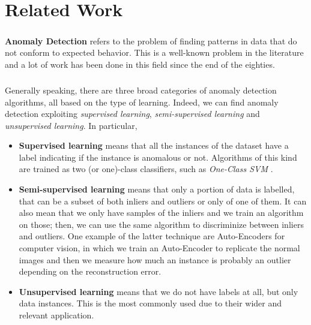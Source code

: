 \chapter{Related Work}
\label{ch:state_of_art}
\paragraph{}
\textbf{Anomaly Detection} refers to the problem of finding patterns in data that do not conform to expected behavior. 
This is a well-known problem in the literature and a lot of work has been done in this field since the end of the eighties. 

\paragraph{}
Generally speaking, there are three broad categories of anomaly detection algorithms, all based on the type of learning. Indeed, we can find anomaly detection exploiting \textit{supervised learning}, \textit{semi-supervised learning} and \textit{unsupervised learning}.
In particular,
\begin{itemize}
    \item \textbf{Supervised learning} means that all the instances of the dataset have a label indicating if the instance is anomalous or not. Algorithms of this kind are trained as two (or one)-class classifiers, such as \textit{One-Class SVM} \cite{one-class-svm}.
    
    \item \textbf{Semi-supervised learning} means that only a portion of data is labelled, that can be a subset of both inliers and outliers or only of one of them. It can also mean that we only have samples of the inliers and we train an algorithm on those; then, we can use the same algorithm to discriminize between inliers and outliers. One example of the latter technique are Auto-Encoders for computer vision, in which we train an Auto-Encoder to replicate the normal images and then we measure how much an instance is probably an outlier depending on the reconstruction error.
    
    \item \textbf{Unsupervised learning} means that we do not have labels at all, but only data instances. This is the most commonly used due to their wider and relevant application.
\end{itemize}

